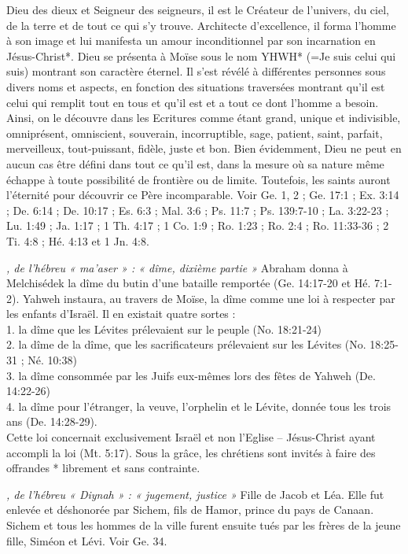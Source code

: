 \begin{multicols}{2}
\textit{}\newline
Dieu des dieux et Seigneur des seigneurs, il est le Créateur de l'univers, du ciel, de la terre et de tout ce qui s'y trouve. Architecte d'excellence, il forma l'homme à son image et lui manifesta un amour inconditionnel par son incarnation en Jésus-Christ*. Dieu se présenta à Moïse sous le nom YHWH* (=Je suis celui qui suis) montrant son caractère éternel. Il s'est révélé à différentes personnes sous divers noms et aspects, en fonction des situations traversées montrant qu'il est celui qui remplit tout en tous et qu'il est et a tout ce dont l'homme a besoin. Ainsi, on le découvre dans les Ecritures comme étant grand, unique et indivisible, omniprésent, omniscient, souverain, incorruptible, sage, patient, saint, parfait, merveilleux, tout-puissant, fidèle, juste et bon. Bien évidemment, Dieu ne peut en aucun cas être défini dans tout ce qu'il est, dans la mesure où sa nature même échappe à toute possibilité de frontière ou de limite. Toutefois, les saints auront l'éternité pour découvrir ce Père incomparable. Voir Ge. 1, 2 ; Ge. 17:1 ; Ex. 3:14 ; De. 6:14 ; De. 10:17 ; Es. 6:3 ; Mal. 3:6 ; Ps. 11:7 ; Ps. 139:7-10 ; La. 3:22-23 ; Lu. 1:49 ; Ja. 1:17 ; 1 Th. 4:17 ; 1 Co. 1:9 ; Ro. 1:23 ; Ro. 2:4 ; Ro. 11:33-36 ; 2 Ti. 4:8 ; Hé. 4:13 et 1 Jn. 4:8.

\textit{, de l'hébreu « ma'aser » : « dîme, dixième partie »}\newline
Abraham donna à Melchisédek la dîme du butin d'une bataille remportée (Ge. 14:17-20 et Hé. 7:1-2). Yahweh instaura, au travers de Moïse, la dîme comme une loi à respecter par les enfants d'Israël. Il en existait quatre sortes :
\\1. la dîme que les Lévites prélevaient sur le peuple (No. 18:21-24)
\\2. la dîme de la dîme, que les sacrificateurs prélevaient sur les Lévites (No. 18:25-31 ; Né. 10:38)
\\3. la dîme consommée par les Juifs eux-mêmes lors des fêtes de Yahweh (De. 14:22-26)
\\4. la dîme pour l'étranger, la veuve, l'orphelin et le Lévite, donnée tous les trois ans (De. 14:28-29).
\\Cette loi concernait exclusivement Israël et non l'Eglise – Jésus-Christ ayant accompli la loi (Mt. 5:17). Sous la grâce, les chrétiens sont invités à faire des offrandes * librement et sans contrainte.

\textit{, de l'hébreu « Diynah » : « jugement, justice »}\newline
Fille de Jacob et Léa. Elle fut enlevée et déshonorée par Sichem, fils de Hamor, prince du pays de Canaan. Sichem et tous les hommes de la ville furent ensuite tués par les frères de la jeune fille, Siméon et Lévi. Voir Ge. 34.


\end{multicols}
